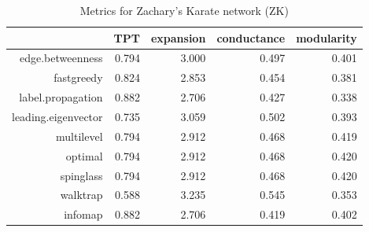 \documentclass[paper=a4, fontsize=11pt]{scrartcl} %
\begin{document}
\begin{table}[ht]
\centering
\begin{tabular}{rrrrr}
  \hline
 & TPT & expansion & conductance & modularity \\ 
  \hline
edge.betweenness & 0.794 & 3.000 & 0.497 & 0.401 \\ 
  
             fastgreedy & 0.824 & 2.853 & 0.454 & 0.381 \\ 
  
             label.propagation & 0.882 & 2.706 & 0.427 & 0.338 \\ 
  
             leading.eigenvector & 0.735 & 3.059 & 0.502 & 0.393 \\ 
  
             multilevel & 0.794 & 2.912 & 0.468 & 0.419 \\ 
  
             optimal & 0.794 & 2.912 & 0.468 & 0.420 \\ 
  
             spinglass & 0.794 & 2.912 & 0.468 & 0.420 \\ 
  
             walktrap & 0.588 & 3.235 & 0.545 & 0.353 \\ 
  
             infomap & 0.882 & 2.706 & 0.419 & 0.402 \\ 
   \hline
\end{tabular}
\caption{Metrics for Zachary's Karate network (ZK)} 
\end{table}
\end{document}
